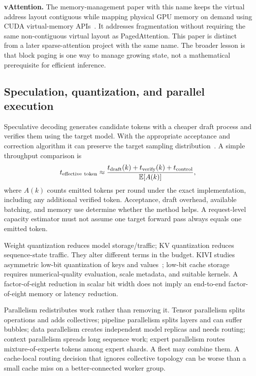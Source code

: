 \textbf{vAttention.} The memory-management paper with this name keeps the
virtual address layout contiguous while mapping physical GPU memory on demand
using CUDA virtual-memory APIs~\cite{vattention}. It addresses fragmentation
without requiring the same non-contiguous virtual layout as PagedAttention.
This paper is distinct from a later sparse-attention project with the same
name. The broader lesson is that block paging is one way to manage growing
state, not a mathematical prerequisite for efficient inference.

\subsection{Speculation, quantization, and parallel execution}
Speculative decoding generates candidate tokens with a cheaper draft process
and verifies them using the target model. With the appropriate acceptance and
correction algorithm it can preserve the target sampling distribution~\cite{spec}.
A simple throughput comparison is
\begin{equation}
 t_{\mathrm{effective\ token}}\approx
 \frac{t_{\mathrm{draft}}(k)+t_{\mathrm{verify}}(k)+t_{\mathrm{control}}}
      {\mathbb{E}[A(k)]},
\end{equation}
where $A(k)$ counts emitted tokens per round under the exact implementation,
including any additional verified token. Acceptance, draft overhead, available
batching, and memory use determine whether the method helps. A request-level
capacity estimator must not assume one target forward pass always equals one
emitted token.

Weight quantization reduces model storage/traffic; KV quantization reduces
sequence-state traffic. They alter different terms in the budget. KIVI studies
asymmetric low-bit quantization of keys and values~\cite{kivi}; low-bit cache
storage requires numerical-quality evaluation, scale metadata, and suitable
kernels. A factor-of-eight reduction in scalar bit width does not imply an
end-to-end factor-of-eight memory or latency reduction.

Parallelism redistributes work rather than removing it. Tensor parallelism
splits operations and adds collectives; pipeline parallelism splits layers and
can suffer bubbles; data parallelism creates independent model replicas and
needs routing; context parallelism spreads long sequence work; expert parallelism
routes mixture-of-experts tokens among expert shards. A fleet may combine them.
A cache-local routing decision that ignores collective topology can be worse
than a small cache miss on a better-connected worker group.

